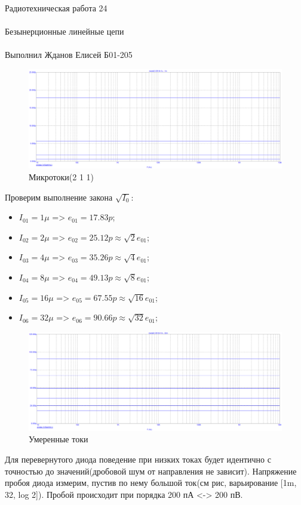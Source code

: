 \documentclass{astroedu-lab}
\begin{document}
\begin{problem}{\huge Радиотехническая работа 24\\\\Безынерционные линейные цепи\\\\Выполнил Жданов Елисей Б01-205}
\begin{enumerate}
\begin{figure}[h!]
    \centering
    \includegraphics[scale=0.3]{images/mod2_1_1.png}
    \caption{Микротоки(2 1 1)}
    \label{fig:m211}
\end{figure}

Проверим выполнение закона $\sqrt{I_0}$:
\begin{itemize}
    \item $I_{01} = 1\mu$ => $e_{01} = 17.83p$;
    \item $I_{02} = 2\mu$ => $e_{02} = 25.12p \approx \sqrt{2}e_{01}$;
    \item $I_{03} = 4\mu$ => $e_{03} = 35.26p \approx \sqrt{4}e_{01}$; 
    \item $I_{04} = 8\mu$ => $e_{04} = 49.13p \approx \sqrt{8}e_{01}$;
    \item $I_{05} = 16\mu$ => $e_{05} = 67.55p \approx \sqrt{16}e_{01}$;
    \item $I_{06} = 32\mu$ => $e_{06} = 90.66p \approx \sqrt{32}e_{01}$;
\end{itemize}

\begin{figure}[h!]
    \centering
    \includegraphics[scale=0.3]{images/mod2_1_2.png}
    \caption{Умеренные токи}
    \label{fig:m212}
\end{figure}

Для перевернутого диода поведение при низких токах будет идентично с точностью до значений(дробовой шум от направления не зависит). Напряжение пробоя диода измерим, пустив по нему большой ток(см рис, варьирование [1m, 32, log 2]). Пробой происходит при порядка 200 пА <-> 200 пВ.


\end{enumerate}
\end{problem}
\end{document}
